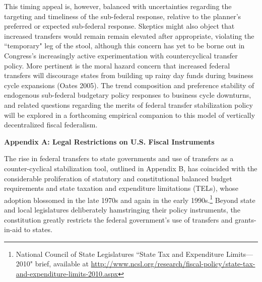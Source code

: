 \documentclass[12pt,letterpaper]{article}
\begin{document}
This timing appeal is, however, balanced with uncertainties regarding the targeting and timeliness of the sub-federal response, relative to the planner's preferred or expected sub-federal response. Skeptics might also object that increased transfers would remain remain elevated after appropriate, violating the ``temporary" leg of the stool, although this concern has yet to be borne out in Congress's increasingly active experimentation with countercyclical transfer policy. More pertinent is the moral hazard concern that increased federal transfers will discourage states from building up rainy day funds during business cycle expansions (Oates 2005). The trend composition and preference stability of endogenous  sub-federal budgetary policy responses to business cycle downturns, and related questions regarding the merits of federal transfer stabilization policy will be explored in a forthcoming empirical companion to this model of vertically decentralized fiscal federalism.

\pagebreak

\nocite{Barro2011, Bi2013, Oh2012, NCSL2010, Woodford2011, Werning2012b, CBO2013, Eggertsson2004b, Mertens2014, Oliff2012, Carlino2013, Taylor2011, Romer2010c, Oates2005, Chodorow-Reich2012, Boadway1996, Christiano2011, Keen1998, Carlino2013b, Mertens2013c, Per, Ramey2011, Mcnichol2012, Nakamura2014, Conley2013, Holtz-Eakin1994, Shoag2013, Blanchard2002, Shoag2010, Carlino2014, Wilson2012, Farhi2012, Correia2013, Krugman1998a, Jonas2012, Oates1972, Inman2003, Calvo1983, Drau2011, PricewaterhouseCoopers2011, Lucas1971} 





\pagebreak

\appendix
\begin{center}
\textbf{Appendix A: Legal Restrictions on U.S. Fiscal Instruments}
\end{center}

\noindent The rise in federal transfers to state governments and use of transfers as a counter-cyclical stabilization tool, outlined in Appendix B, has coincided with the considerable proliferation of statutory and constitutional balanced budget requirements and state taxation and expenditure limitations (TELs), whose adoption blossomed in the late 1970s and again in the early 1990s.\footnote{National Council of State Legislatures ``State Tax and Expenditure Limits---2010" brief, available at \url{http://www.ncsl.org/research/fiscal-policy/state-tax-and-expenditure-limits-2010.aspx}}  Beyond state and local legislatures deliberately hamstringing their policy instruments, the constitution greatly restricts the federal government's use of transfers and grants-in-aid to states.  \bigskip
\end{document}

